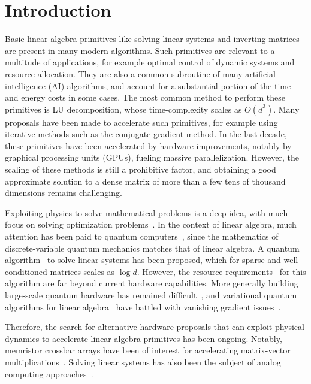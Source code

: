 \documentclass[prx,onecolumn,floatfix,longbibliography,notitlepage, nofootinbib]{revtex4-1}
\begin{document}
\section{Introduction}
Basic linear algebra primitives like solving linear systems and inverting matrices are present in many modern algorithms. Such primitives are relevant to a multitude of applications, for example optimal control of dynamic systems and resource allocation. They are also a common subroutine of many artificial intelligence (AI) algorithms, and account for a substantial portion of the time and energy costs in some cases. The most common method to perform these primitives is LU decomposition, whose time-complexity scales as $O(d^3)$. Many proposals have been made to accelerate such primitives, for example using iterative methods such as the conjugate gradient method. 
In the last decade, these primitives have been accelerated by hardware improvements, notably by graphical processing units (GPUs), fueling massive parallelization. However, the scaling of these methods is still a prohibitive factor, and obtaining a good approximate solution to a dense matrix of more than a few tens of thousand dimensions remains challenging.

Exploiting physics to solve mathematical problems is a deep idea, with much focus on solving optimization problems~\cite{vadlamani2020physics,mohseni2022ising,inagaki2016coherent}. In the context of linear algebra, much attention has been paid to quantum computers~\cite{feynman1982simulating}, since the mathematics of discrete-variable quantum mechanics matches that of linear algebra. A quantum algorithm~\cite{harrow2009quantum} to solve linear systems has been proposed, which for sparse and well-conditioned matrices scales as $\log d$. However, the resource requirements~\cite{scherer2017concrete} for this algorithm are far beyond current hardware capabilities. More generally building large-scale quantum hardware has remained difficult~\cite{preskill2018quantum}, and variational quantum algorithms for linear algebra~\cite{bravo2020variational,xu2019variational,cerezo2020variationalreview} have battled with vanishing gradient issues~\cite{mcclean2018barren,cerezo2020cost,wang2020noise}. 

Therefore, the search for alternative hardware proposals that can exploit physical dynamics to accelerate linear algebra primitives has been ongoing. Notably, memristor crossbar arrays have been of interest for accelerating matrix-vector multiplications~\cite{li2018analogue,yi2023activity}. Solving linear systems has also been the subject of analog computing approaches~\cite{huang2016evaluation}.
\end{document}
